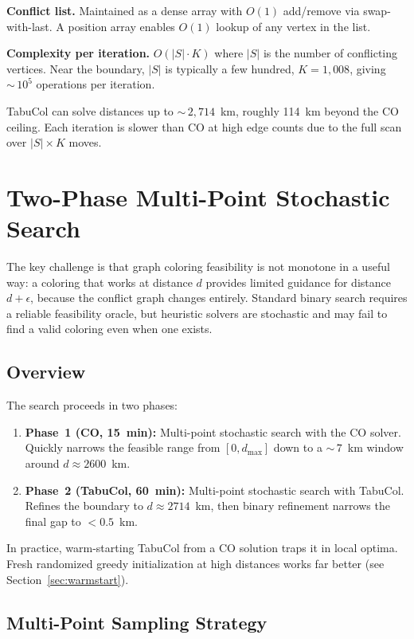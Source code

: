 \documentclass[11pt,a4paper]{article}
\begin{document}
\textbf{Conflict list.} Maintained as a dense array with $O(1)$ add/remove via
swap-with-last. A position array enables $O(1)$ lookup of any vertex in the list.

\textbf{Complexity per iteration.} $O(|S| \cdot K)$ where $|S|$ is the number of
conflicting vertices. Near the boundary, $|S|$ is typically a few hundred,
$K = 1{,}008$, giving ${\sim}\, 10^5$ operations per iteration.

TabuCol can solve distances up to ${\sim}\, 2{,}714$~km, roughly 114~km beyond the CO
ceiling. Each iteration is slower than CO at high edge counts due to the full scan over
$|S| \times K$ moves.


\section{Two-Phase Multi-Point Stochastic Search}

The key challenge is that graph coloring feasibility is not monotone in a useful way: a
coloring that works at distance $d$ provides limited guidance for distance $d + \epsilon$,
because the conflict graph changes entirely. Standard binary search requires a reliable
feasibility oracle, but heuristic solvers are stochastic and may fail to find a valid
coloring even when one exists.

\subsection{Overview}

The search proceeds in two phases:
\begin{enumerate}
  \item \textbf{Phase~1 (CO, 15~min):} Multi-point stochastic search with the CO
        solver. Quickly narrows the feasible range from $[0, d_{\max}]$ down to a
        ${\sim}\, 7$~km window around $d \approx 2600$~km.
  \item \textbf{Phase~2 (TabuCol, 60~min):} Multi-point stochastic search with
        TabuCol. Refines the boundary to $d \approx 2714$~km, then binary
        refinement narrows the final gap to $< 0.5$~km.
\end{enumerate}

In practice, warm-starting TabuCol from a CO solution traps it in local
optima. Fresh randomized greedy initialization at high distances works far better (see
Section~\ref{sec:warmstart}).

\subsection{Multi-Point Sampling Strategy}
\end{document}
